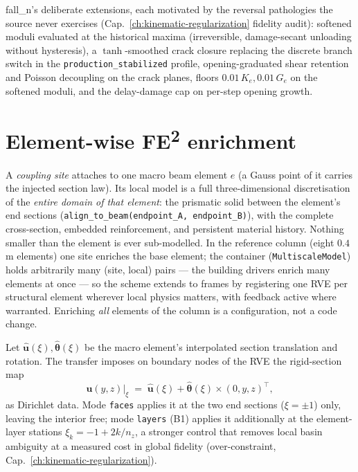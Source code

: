 fall\_n's deliberate extensions, each motivated by the reversal
pathologies the source never exercises
(Cap.~\ref{ch:kinematic-regularization} fidelity audit): softened
moduli evaluated at the historical maxima (irreversible,
damage-secant unloading without hysteresis), a $\tanh$-smoothed crack
closure replacing the discrete branch switch in the
\texttt{production\_stabilized} profile, opening-graduated shear
retention and Poisson decoupling on the crack planes, floors
$0.01\,K_e, 0.01\,G_e$ on the softened moduli, and the delay-damage
cap on per-step opening growth.

\section{Element-wise FE\textsuperscript{2} enrichment}
\label{sec:tc-fe2}

\begin{definition}[Coupling site and RVE $=$ macro element]
\label{def:tc-site}
A \emph{coupling site} attaches to one macro beam element $e$ (a
Gauss point of it carries the injected section law). Its local model
is a full three-dimensional discretisation of the \emph{entire domain
of that element}: the prismatic solid between the element's end
sections (\texttt{align\_to\_beam(endpoint\_A, endpoint\_B)}), with
the complete cross-section, embedded reinforcement, and persistent
material history. Nothing smaller than the element is ever
sub-modelled. In the reference column (eight $0.4$\,m elements) one
site enriches the base element; the container
(\texttt{MultiscaleModel}) holds arbitrarily many (site, local) pairs
--- the building drivers enrich many elements at once --- so the
scheme extends to frames by registering one RVE per structural
element wherever local physics matters, with feedback active where
warranted. Enriching \emph{all} elements of the column is a
configuration, not a code change.
\end{definition}

\begin{definition}
Let $\hat{\mathbf u}(\xi), \hat{\bm\theta}(\xi)$ be the macro
element's interpolated section translation and rotation. The transfer
imposes on boundary nodes of the RVE the rigid-section map
\[
  \mathbf u(y,z)\big|_{\xi}
  \;=\; \hat{\mathbf u}(\xi) + \hat{\bm\theta}(\xi)\times(0,y,z)^\top ,
\]
as Dirichlet data. Mode \texttt{faces} applies it at the two end
sections ($\xi=\pm1$) only, leaving the interior free; mode
\texttt{layers} (B1) applies it additionally at the element-layer
stations $\xi_k=-1+2k/n_z$, a stronger control that removes local
basin ambiguity at a measured cost in global fidelity
(over-constraint, Cap.~\ref{ch:kinematic-regularization}).
\end{definition}


